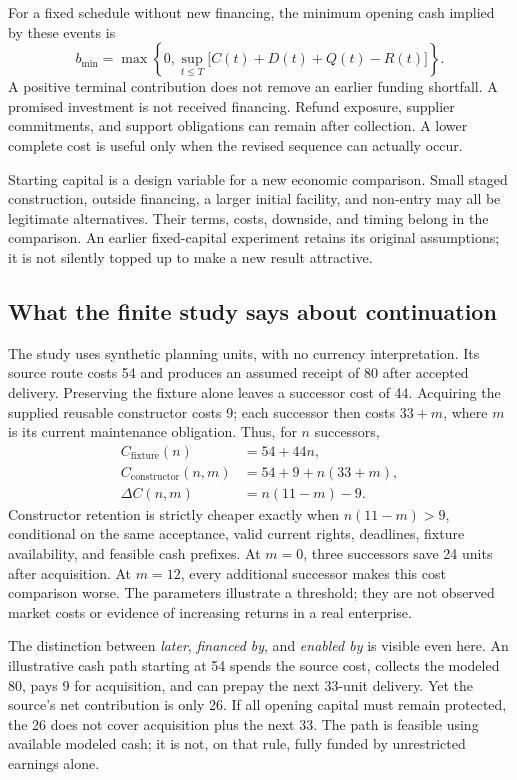For a fixed schedule without new financing, the minimum opening cash implied by these events is
\begin{equation}
b_{\min}=\max\left\{0,\sup_{t\le T}\big[C(t)+D(t)+Q(t)-R(t)\big]\right\}.
\label{eq:prefunding}
\end{equation}
A positive terminal contribution does not remove an earlier funding shortfall. A promised investment is not received financing. Refund exposure, supplier commitments, and support obligations can remain after collection. A lower complete cost is useful only when the revised sequence can actually occur.

Starting capital is a design variable for a new economic comparison. Small staged construction, outside financing, a larger initial facility, and non-entry may all be legitimate alternatives. Their terms, costs, downside, and timing belong in the comparison. An earlier fixed-capital experiment retains its original assumptions; it is not silently topped up to make a new result attractive.

\subsection{What the finite study says about continuation}

The study uses synthetic planning units, with no currency interpretation. Its source route costs 54 and produces an assumed receipt of 80 after accepted delivery. Preserving the fixture alone leaves a successor cost of 44. Acquiring the supplied reusable constructor costs 9; each successor then costs $33+m$, where $m$ is its current maintenance obligation. Thus, for $n$ successors,
\begin{align}
C_{\mathrm{fixture}}(n)&=54+44n,\\
C_{\mathrm{constructor}}(n,m)&=54+9+n(33+m),\\
\Delta C(n,m)&=n(11-m)-9.
\label{eq:retention}
\end{align}
Constructor retention is strictly cheaper exactly when $n(11-m)>9$, conditional on the same acceptance, valid current rights, deadlines, fixture availability, and feasible cash prefixes. At $m=0$, three successors save 24 units after acquisition. At $m=12$, every additional successor makes this cost comparison worse. The parameters illustrate a threshold; they are not observed market costs or evidence of increasing returns in a real enterprise.

The distinction between \emph{later}, \emph{financed by}, and \emph{enabled by} is visible even here. An illustrative cash path starting at 54 spends the source cost, collects the modeled 80, pays 9 for acquisition, and can prepay the next 33-unit delivery. Yet the source's net contribution is only 26. If all opening capital must remain protected, the 26 does not cover acquisition plus the next 33. The path is feasible using available modeled cash; it is not, on that rule, fully funded by unrestricted earnings alone.

